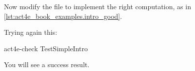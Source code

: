 Now modify the file to implement the right computation, as in \cref{lst:act4e_book_examples.intro_good}.

\begin{longcode}
    \caption{}
    \label{lst:act4e_book_examples.intro_good}
\end{longcode}

Trying again this:

\begin{console}
    act4e-check TestSimpleIntro
\end{console}

You will see a success result.

